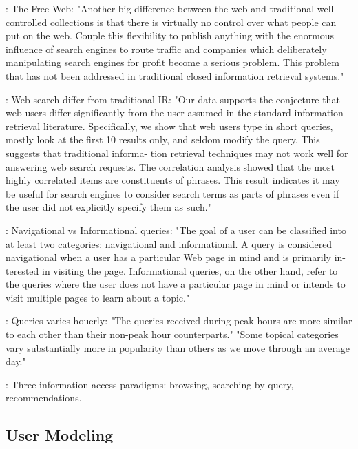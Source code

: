 \cite[p6]{Bender2005}: The Free Web:
"Another big difference between the web and traditional well controlled collections is that there is virtually no control over what people can put on the web. Couple this flexibility to publish anything with the enormous influence of search engines to route traffic and companies which deliberately manipulating search engines for profit become a serious problem. This problem that has not been addressed in traditional closed information retrieval systems."

\cite[p1]{Silverstein1999}: Web search differ from traditional IR:
"Our data supports the conjecture that web users differ significantly from the user assumed in the standard information retrieval literature. 
Specifically, we show that web users type in short queries, mostly look at the first 10 results only, and seldom modify the query. 
This suggests that traditional informa- tion retrieval techniques may not work well for answering web search requests. 
The correlation analysis showed that the most highly correlated items are constituents of phrases. 
This result indicates it may be useful for search engines to consider search terms as parts of phrases even if the user did not explicitly specify them as such."

\cite[p1]{Lee2005}: Navigational vs Informational queries: "The goal of a user can be classified into at least two categories: navigational and informational.
A query is considered navigational when a user has a particular Web page in mind and is primarily in- terested in visiting the page. 
Informational queries, on the other hand, refer to the queries where the user does not have a particular page in mind 
or intends to visit multiple pages to learn about a topic."

\cite[p1]{Beitzel2004}: Queries varies houerly:
"The queries received during peak hours are more similar to each other than their non-peak hour counterparts."
"Some topical categories vary substantially more in popularity than others as we move through an average day."

\cite[p2]{Micarelli2007}: Three information access paradigms: browsing, searching by query, recommendations.


\subsection{User Modeling}

